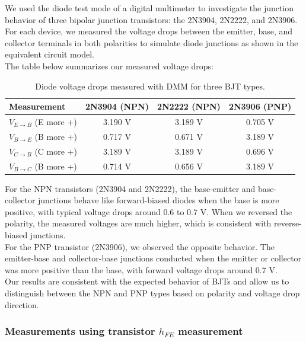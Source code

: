 \documentclass{article}
\begin{document}
We used the diode test mode of a digital multimeter to investigate the
junction behavior of three bipolar junction transistors: the 2N3904, 2N2222, and
2N3906. For each device, we measured the voltage drops between the emitter,
base, and collector terminals in both polarities to simulate diode junctions as
shown in the equivalent circuit model.\\

\noindent The table below summarizes our measured voltage drops:

\begin{table}[H]
  \centering
  \begin{tabular}{|l|c|c|c|}
    \hline
    Measurement & 2N3904 (NPN) & 2N2222 (NPN) & 2N3906 (PNP) \\
    \hline
    $V_{E \rightarrow B}$ (E more +) & 3.190 V & 3.189 V & 0.705 V \\
    $V_{B \rightarrow E}$ (B more +) & 0.717 V & 0.671 V & 3.189 V \\
    $V_{C \rightarrow B}$ (C more +) & 3.189 V & 3.189 V & 0.696 V \\
    $V_{B \rightarrow C}$ (B more +) & 0.714 V & 0.656 V & 3.189 V \\
    \hline
  \end{tabular}
  \caption{Diode voltage drops measured with DMM for three BJT types.}
\end{table}

\noindent For the NPN transistors (2N3904 and 2N2222), the base-emitter and base-collector
junctions behave like forward-biased diodes when the base is more positive, with
typical voltage drops around 0.6 to 0.7 V. When we reversed the polarity, the
measured voltages are much higher, which is consistent with reverse-biased junctions.\\

\noindent For the PNP transistor (2N3906), we observed the opposite behavior. The emitter-base and
collector-base junctions conducted when the emitter or collector was more
positive than the base, with forward voltage drops around 0.7 V.\\

\noindent Our results are consistent with the expected behavior of BJTs and allow us to 
distinguish between the NPN and PNP types based on polarity and voltage drop direction.

\subsubsection{Measurements using transistor $h_{FE}$ measurement}
\end{document}
